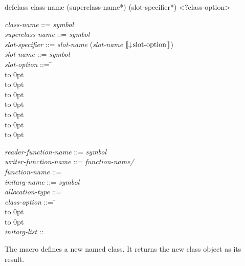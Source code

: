 \begin{defmac}
defclass class-name ({superclass-name}*)
         ({slot-specifier}*) <?class-option>

\begin{tabbing}
\emph{class-name\/} ::= \emph{symbol\/} \\
\emph{superclass-name\/} ::= \emph{symbol\/}\\
\emph{slot-specifier\/} ::= \emph{slot-name\/} {\Mor} (\emph{slot-name\/}  $\lbrack\!\lbrack\downarrow\!\hbox{slot-option}\,\rbrack\!\rbrack$)\\
\emph{slot-name\/} ::= \emph{symbol\/}\\
\pushtabs\emph{slot-option\/} ::= \= \\
\>\hbox to 0pt{\hss\Mor~} \\
\>\hbox to 0pt{\hss\Mor~} \\
\>\hbox to 0pt{\hss\Mor~} \\
\>\hbox to 0pt{\hss\Mor~} \\
\>\hbox to 0pt{\hss\Mor~} \\
\>\hbox to 0pt{\hss\Mor~} \\
\>\hbox to 0pt{\hss\Mor~} \poptabs
\end{tabbing}
\begin{tabbing}
\emph{reader-function-name\/} ::= \emph{symbol\/}\\
\emph{writer-function-name\/} ::= \emph{function-name/}\\
\emph{function-name\/} ::= \\
\emph{initarg-name\/} ::= \emph{symbol\/}\\
\emph{allocation-type\/} ::= \\
\pushtabs\emph{class-option\/} ::= \= \\
\>\hbox to 0pt{\hss\Mor~} \\
\>\hbox to 0pt{\hss\Mor~} \poptabs \\
\emph{initarg-list\/} ::= 
\end{tabbing}
The macro  defines a new named class.  It returns the new class
object as its result.


\end{defmac}
